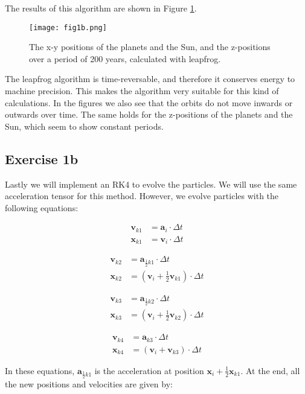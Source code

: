 The results of this algorithm are shown in Figure \ref{fig:1b}. 
\begin{figure}[h!]
  \centering
  \texttt{[image: fig1b.png]}
  \caption{The x-y positions of the planets and the Sun, and the z-positions over a period of 200 years, calculated with leapfrog.}
  \label{fig:1b}
\end{figure}

The leapfrog algorithm is time-reversable, and therefore it conserves energy to machine precision. This makes the algorithm very suitable for this kind of calculations. In the figures we also see that the orbits do not move inwards or outwards over time. The same holds for the z-positions of the planets and the Sun, which seem to show constant periods.

\subsection{Exercise 1b}
Lastly we will implement an RK4 to evolve the particles. We will use the same acceleration tensor for this method. However, we evolve particles with the following equations: 

\begin{align}
    \mathbf{v}_{k1} &= \mathbf{a}_i \cdot \Delta t \\
    \mathbf{x}_{k1} &= \mathbf{v}_i \cdot \Delta t
\end{align}

\begin{align}
    \mathbf{v}_{k2} &= \mathbf{a}_{\frac{1}{2}k1} \cdot \Delta t \\
    \mathbf{x}_{k2} &= (\mathbf{v}_i  + \frac{1}{2}\mathbf{v}_{k1}) \cdot \Delta t
\end{align}

\begin{align}
    \mathbf{v}_{k3} &= \mathbf{a}_{\frac{1}{2}k2} \cdot \Delta t \\
    \mathbf{x}_{k3} &= (\mathbf{v}_i  + \frac{1}{2}\mathbf{v}_{k2}) \cdot \Delta t
\end{align}

\begin{align}
    \mathbf{v}_{k4} &= \mathbf{a}_{k3} \cdot \Delta t \\
    \mathbf{x}_{k4} &= (\mathbf{v}_i  + \mathbf{v}_{k3}) \cdot \Delta t
\end{align}

In these equations, $\mathbf{a}_{\frac{1}{2}k1}$ is the acceleration at position $ \mathbf{x}_i + \frac{1}{2}\mathbf{x}_{k1}$. At the end, all the new positions and velocities are given by: 

